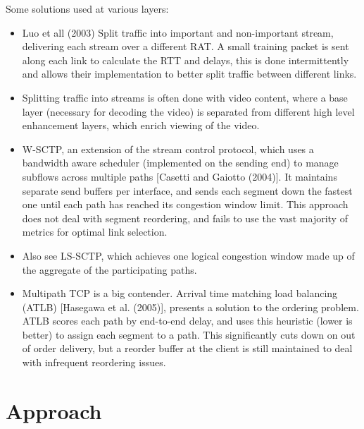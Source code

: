 \documentclass[12pt]{article}
\begin{document}
		Some solutions used at various layers:
		\begin{itemize}
			\item Luo et all (2003) Split traffic into important and non-important stream, delivering each stream over a different RAT. A small training packet is sent along each link to calculate the RTT and delays, this is done intermittently and allows their implementation to better split traffic between different links.
			\item Splitting traffic into streams is often done with video content, where a base layer (necessary for decoding the video) is separated from different high level enhancement layers, which enrich viewing of the video.
			\item W-SCTP, an extension of the stream control protocol, which uses a bandwidth aware scheduler (implemented on the sending end) to manage subflows across multiple paths [Casetti and Gaiotto (2004)]. It maintains separate send buffers per interface, and sends each segment down the fastest one until each path has reached its congestion window limit. This approach does not deal with segment reordering, and fails to use the vast majority of metrics for optimal link selection.
			\item Also see LS-SCTP, which achieves one logical congestion window made up of the aggregate of the participating paths.
			\item Multipath TCP is a big contender. Arrival time matching load balancing (ATLB) [Hasegawa et al. (2005)], presents a solution to the ordering problem. ATLB scores each path by end-to-end delay, and uses this heuristic (lower is better) to assign each segment to a path. This significantly cuts down on out of order delivery, but a reorder buffer at the client is still maintained to deal with infrequent reordering issues.
		\end{itemize}

\section{Approach}
\end{document}
